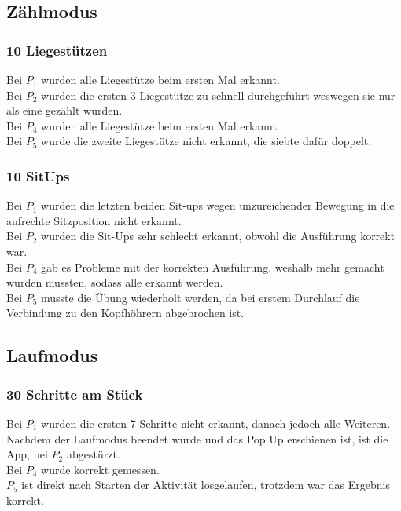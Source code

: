 \documentclass[a4paper,12pt]{article}
\begin{document}
\subsection{Zählmodus}
\subsubsection{10 Liegestützen}
Bei $P_1$ wurden alle Liegestütze beim ersten Mal erkannt.\\
Bei $P_2$ wurden die ersten 3 Liegestütze zu schnell durchgeführt weswegen sie nur als eine gezählt wurden.\\
Bei $P_4$ wurden alle Liegestütze beim ersten Mal erkannt.\\
Bei $P_5$ wurde die zweite Liegestütze nicht erkannt, die siebte dafür doppelt.\\
\subsubsection{10 SitUps}
Bei $P_1$ wurden die letzten beiden Sit-ups wegen unzureichender Bewegung in die aufrechte Sitzposition nicht erkannt.\\
Bei $P_2$ wurden die Sit-Ups sehr schlecht erkannt, obwohl die Ausführung korrekt war.\\
Bei $P_4$ gab es Probleme mit der korrekten Ausführung, weshalb mehr gemacht wurden mussten, sodass alle erkannt werden.\\
Bei $P_5$ musste die Übung wiederholt werden, da bei erstem Durchlauf die Verbindung zu den Kopfhöhrern abgebrochen ist.
\subsection{Laufmodus}
\subsubsection{30 Schritte am Stück}
Bei $P_1$ wurden die ersten 7 Schritte nicht erkannt, danach jedoch alle Weiteren.\\
Nachdem der Laufmodus beendet wurde und das Pop Up erschienen ist, ist die App, bei $P_2$  abgestürzt.\\
Bei $P_4$ wurde korrekt gemessen.\\
$P_5$ ist direkt nach Starten der Aktivität losgelaufen, trotzdem war das Ergebnis korrekt.
\end{document}
